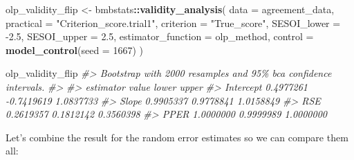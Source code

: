 \documentclass[
]{book}
\newenvironment{Shaded}{\begin{snugshade}}{\end{snugshade}}
\newcommand{\CommentTok}[1]{\textcolor[rgb]{0.56,0.35,0.01}{\textit{#1}}}
\newcommand{\DataTypeTok}[1]{\textcolor[rgb]{0.13,0.29,0.53}{#1}}
\newcommand{\DecValTok}[1]{\textcolor[rgb]{0.00,0.00,0.81}{#1}}
\newcommand{\FloatTok}[1]{\textcolor[rgb]{0.00,0.00,0.81}{#1}}
\newcommand{\KeywordTok}[1]{\textcolor[rgb]{0.13,0.29,0.53}{\textbf{#1}}}
\newcommand{\NormalTok}[1]{#1}
\newcommand{\OperatorTok}[1]{\textcolor[rgb]{0.81,0.36,0.00}{\textbf{#1}}}
\newcommand{\StringTok}[1]{\textcolor[rgb]{0.31,0.60,0.02}{#1}}
\begin{document}
\begin{Shaded}
\begin{Highlighting}[]
\NormalTok{olp\_validity\_flip <{-}}\StringTok{ }\NormalTok{bmbstats}\OperatorTok{::}\KeywordTok{validity\_analysis}\NormalTok{(}
  \DataTypeTok{data =}\NormalTok{ agreement\_data,}
  \DataTypeTok{practical =} \StringTok{"Criterion\_score.trial1"}\NormalTok{,}
  \DataTypeTok{criterion =} \StringTok{"True\_score"}\NormalTok{,}
  \DataTypeTok{SESOI\_lower =} \FloatTok{{-}2.5}\NormalTok{,}
  \DataTypeTok{SESOI\_upper =} \FloatTok{2.5}\NormalTok{,}
  \DataTypeTok{estimator\_function =}\NormalTok{ olp\_method,}
  \DataTypeTok{control =} \KeywordTok{model\_control}\NormalTok{(}\DataTypeTok{seed =} \DecValTok{1667}\NormalTok{)}
\NormalTok{)}

\NormalTok{olp\_validity\_flip}
\CommentTok{\#> Bootstrap with 2000 resamples and 95\% bca confidence intervals.}
\CommentTok{\#> }
\CommentTok{\#>  estimator     value      lower     upper}
\CommentTok{\#>  Intercept 0.4977261 {-}0.7419619 1.0837733}
\CommentTok{\#>      Slope 0.9905337  0.9778841 1.0158849}
\CommentTok{\#>        RSE 0.2619357  0.1812142 0.3560398}
\CommentTok{\#>       PPER 1.0000000  0.9999989 1.0000000}
\end{Highlighting}
\end{Shaded}

Let's combine the result for the random error estimates so we can compare them all:
\end{document}
